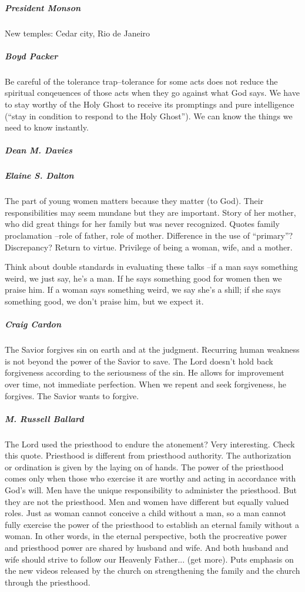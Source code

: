 \subparagraph*{President Monson} New temples: Cedar city, Rio de Janeiro

\subparagraph*{Boyd Packer} Be careful of the tolerance trap--tolerance for some acts does not reduce the spiritual conqeuences of those acts when they go against what God says. We have to stay worthy of the Holy Ghost to receive its promptings and pure intelligence (``stay in condition to respond to the Holy Ghost''). We can know the things we need to know instantly.

\subparagraph*{Dean M. Davies}

\subparagraph*{Elaine S. Dalton} The part of young women matters because they matter (to God). Their responsibilities may seem mundane but they are important. Story of her mother, who did great things for her family but was never recognized. Quotes family proclamation --role of father, role of mother. Difference in the use of ``primary''? Discrepancy? Return to virtue. Privilege of being a woman, wife, and a mother.

Think about double standards in evaluating these talks --if a man says something weird, we just say, he's a man. If he says something good for women then we praise him. If a woman says something weird, we say she's a shill; if she says something good, we don't praise him, but we expect it.

\subparagraph*{Craig Cardon} The Savior forgives sin on earth and at the judgment. Recurring human weakness is not beyond the power of the Savior to save. The Lord doesn't hold back forgiveness according to the seriousness of the sin. He allows for improvement over time, not immediate perfection. When we repent and seek forgiveness, he forgives. The Savior wants to forgive.

\subparagraph*{M. Russell Ballard} The Lord used the priesthood to endure the atonement? Very interesting. Check this quote. Priesthood is different from priesthood authority. The authorization or ordination is given by the laying on of hands. The power of the priesthood comes only when those who exercise it are worthy and acting in accordance with God's will. Men have the unique responsibility to administer the priesthood. But they are not the priesthood. Men and women have different but equally valued roles. Just as woman cannot conceive a child without a man, so a man cannot fully exercise the power of the priesthood to establish an eternal family without a woman. In other words, in the eternal perspective, both the procreative power and priesthood power are shared by husband and wife. And both husband and wife should strive to follow our Heavenly Father... (get more). Puts emphasis on the new videos released by the church on strengthening the family and the church through the priesthood.

